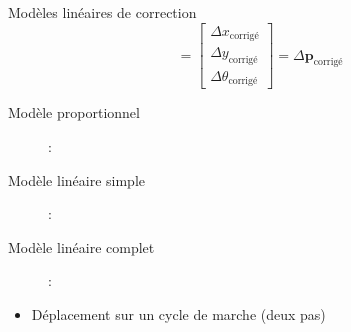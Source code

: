 \begin{frame}{Modèles linéaires de correction}
$$    =
    \begin{bmatrix}
        \Delta x_{\text{corrigé}} \\   
        \Delta y_{\text{corrigé}} \\   
        \Delta \theta_{\text{corrigé}}
    \end{bmatrix}
    =
    \Delta \bm{p}_{\text{corrigé}}
    $$
    \vspace{1em}
    \begin{description}
        \item[Modèle proportionnel] :
        \item[Modèle linéaire simple] : 
        \item[Modèle linéaire complet] :
    \end{description}
    \begin{itemize}
        \item Déplacement sur un cycle de marche (deux pas)
    \end{itemize}
\end{frame}

